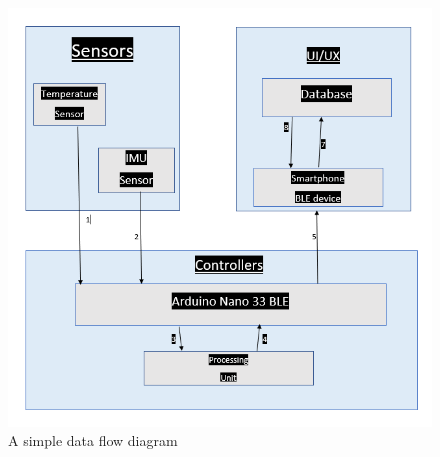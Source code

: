 

\begin{figure}[h!]
	\centering
 	\includegraphics[width=\textwidth]{images/data flow}
 \caption{A simple data flow diagram}
\end{figure}
